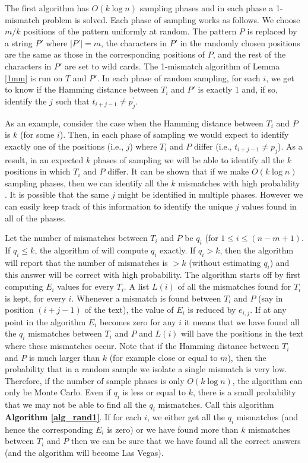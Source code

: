 The first algorithm has $O(k\log n)$ sampling phases and in each phase a
1-mismatch problem is solved. Each phase of sampling works as follows. We
choose $m/k$ positions of the pattern uniformly at random. The pattern $P$ is
replaced by a string $P'$ where $|P'|=m$, the characters in $P'$ in the
randomly chosen positions are the same as those in the corresponding positions
of $P$, and the rest of the characters in $P'$ are set to wild cards. The
1-mismatch algorithm of Lemma \ref{1mm} is run on $T$ and $P'$. In each phase
of random sampling, for each $i$, we get to know if the Hamming distance
between $T_i$ and $P'$ is exactly 1 and, if so, identify the $j$ such that
$t_{i+j-1}\neq p_j^\prime$.

As an example, consider the case when the Hamming distance between $T_i$ and
$P$ is $k$ (for some $i$). Then, in each phase of sampling we would expect to
identify exactly one of the positions (i.e., $j$) where $T_i$ and $P$ differ
(i.e., $t_{i+j-1}\neq p_j$). As a result, in an expected $k$ phases of sampling
we will be able to identify all the $k$ positions in which $T_i$ and $P$
differ. It can be shown that if we make $O(k\log n)$ sampling phases, then we
can identify all the $k$ mismatches with high probability \cite{CEP+07}.
It is possible that the same $j$ might be identified in multiple phases.
However we can easily keep track of this information to identify the unique $j$ values found in all of the phases.

Let the number of mismatches between $T_i$ and $P$ be $q_i$ (for $1\leq i\leq
(n-m+1)$. If $q_i\leq k$, the algorithm of \cite{CEP+07} will compute $q_i$
exactly. If $q_i>k$, then the algorithm will report that the number of
mismatches is $>k$ (without estimating $q_i$) and this answer will be correct
with high probability. The algorithm starts off by first computing $E_i$ values
for every $T_i$. A list $L(i)$ of all the mismatches found for $T_i$ is kept,
for every $i$. Whenever a mismatch is found between $T_i$ and $P$ (say in
position $(i+j-1)$ of the text), the value of $E_i$ is reduced by $e_{i,j}$. If
at any point in the algorithm $E_i$ becomes zero for any $i$ it means that we
have found all the $q_i$ mismatches between $T_i$ and $P$ and $L(i)$ will have
the positions in the text where these mismatches occur. Note that if the
Hamming distance between $T_i$ and $P$ is much larger than $k$ (for example
close or equal to $m$), then the probability that in a random sample we isolate
a single mismatch is very low. Therefore, if the number of sample phases is
only $O(k\log n)$, the algorithm can only be Monte Carlo. Even if $q_i$ is
less or equal to $k$, there is a small probability that we may not be able
to find all the $q_i$ mismatches. Call this algorithm {\bf Algorithm
\ref{alg_rand1}}.
If for each $i$, we either get all the $q_i$ mismatches (and hence the corresponding $E_i$ is zero)
or we have found more than $k$ mismatches between $T_i$ and $P$ then we can be
sure that we have found all the correct answers (and the algorithm will become Las
Vegas).

